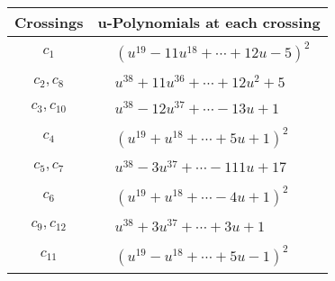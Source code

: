\documentclass[1p]{elsarticle_modified}
\theoremstyle{definition}
\begin{document}
\begin{tabular}{m{50pt}|m{274pt}}
Crossings & \hspace{64pt}u-Polynomials at each crossing \\
\hline $$\begin{aligned}c_{1}\end{aligned}$$&$\begin{aligned}
&(u^{19}-11 u^{18}+\cdots+12 u-5)^{2}
\end{aligned}$\\
\hline $$\begin{aligned}c_{2},c_{8}\end{aligned}$$&$\begin{aligned}
&u^{38}+11 u^{36}+\cdots+12 u^2+5
\end{aligned}$\\
\hline $$\begin{aligned}c_{3},c_{10}\end{aligned}$$&$\begin{aligned}
&u^{38}-12 u^{37}+\cdots-13 u+1
\end{aligned}$\\
\hline $$\begin{aligned}c_{4}\end{aligned}$$&$\begin{aligned}
&(u^{19}+u^{18}+\cdots+5 u+1)^{2}
\end{aligned}$\\
\hline $$\begin{aligned}c_{5},c_{7}\end{aligned}$$&$\begin{aligned}
&u^{38}-3 u^{37}+\cdots-111 u+17
\end{aligned}$\\
\hline $$\begin{aligned}c_{6}\end{aligned}$$&$\begin{aligned}
&(u^{19}+u^{18}+\cdots-4 u+1)^{2}
\end{aligned}$\\
\hline $$\begin{aligned}c_{9},c_{12}\end{aligned}$$&$\begin{aligned}
&u^{38}+3 u^{37}+\cdots+3 u+1
\end{aligned}$\\
\hline $$\begin{aligned}c_{11}\end{aligned}$$&$\begin{aligned}
&(u^{19}- u^{18}+\cdots+5 u-1)^{2}
\end{aligned}$\\
\hline
\end{tabular}\\~\\
\end{document}
